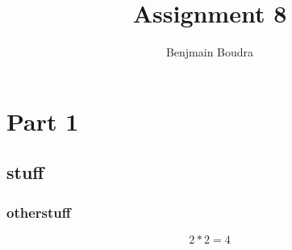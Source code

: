 \documentclass{Algorithms}
\title{Assignment 8}
\author{Benjmain Boudra}
\begin{document}
\maketitle
\tableofcontents
\section{Part 1}
\subsection{stuff}
\subsubsection{otherstuff}
\begin{equation}
  2 * 2 = 4
\end{equation}
\end{document}
